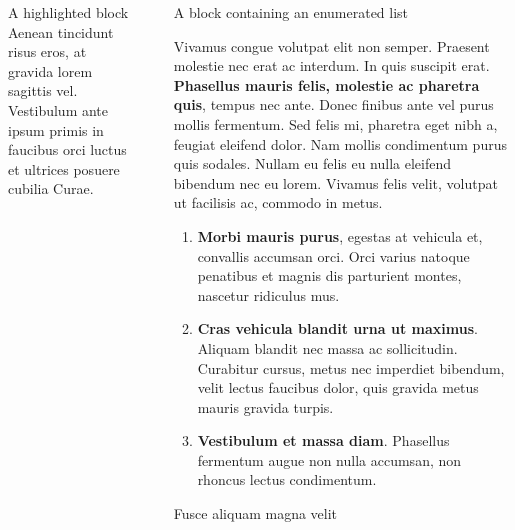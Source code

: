 \documentclass[final]{beamer}
\newlength{\sepwidth}
\newlength{\colwidth}
\newcommand{\separatorcolumn}{\begin{column}{\sepwidth}\end{column}}
\begin{document}
\begin{frame}[t]
\begin{columns}[t]
\begin{column}{\colwidth}
\begin{alertblock}{A highlighted block}
                Aenean tincidunt risus eros, at gravida lorem sagittis vel. Vestibulum ante
                ipsum primis in faucibus orci luctus et ultrices posuere cubilia Curae.

            \end{alertblock}

        \end{column}

        \separatorcolumn

        \begin{column}{\colwidth}

            \begin{block}{A block containing an enumerated list}

                Vivamus congue volutpat elit non semper. Praesent molestie nec erat ac
                interdum. In quis suscipit erat. \textbf{Phasellus mauris felis, molestie
                    ac pharetra quis}, tempus nec ante. Donec finibus ante vel purus mollis
                fermentum. Sed felis mi, pharetra eget nibh a, feugiat eleifend dolor. Nam
                mollis condimentum purus quis sodales. Nullam eu felis eu nulla eleifend
                bibendum nec eu lorem. Vivamus felis velit, volutpat ut facilisis ac,
                commodo in metus.

                \begin{enumerate}
                    \item \textbf{Morbi mauris purus}, egestas at vehicula et, convallis
                          accumsan orci. Orci varius natoque penatibus et magnis dis parturient
                          montes, nascetur ridiculus mus.
                    \item \textbf{Cras vehicula blandit urna ut maximus}. Aliquam blandit nec
                          massa ac sollicitudin. Curabitur cursus, metus nec imperdiet bibendum,
                          velit lectus faucibus dolor, quis gravida metus mauris gravida turpis.
                    \item \textbf{Vestibulum et massa diam}. Phasellus fermentum augue non
                          nulla accumsan, non rhoncus lectus condimentum.
                \end{enumerate}

            \end{block}

            \begin{block}{Fusce aliquam magna velit}


\end{block}
\end{column}
\end{columns}
\end{frame}
\end{document}

